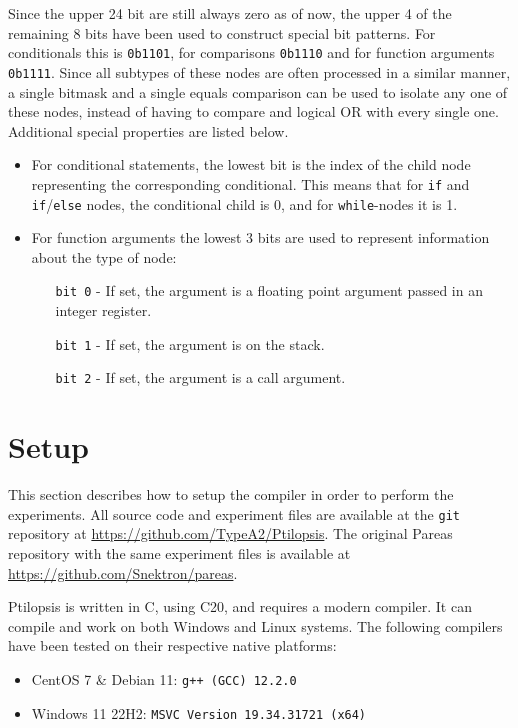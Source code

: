 \documentclass[12pt,dvipsnames]{article}
\newcommand{\icpp}[1]{\texttt{#1}}
\newcommand{\mono}[1]{\texttt{#1}}
\newcommand{\Rplus}{\protect\hspace{-.1em}\protect\raisebox{.35ex}{\smaller{\smaller\textbf{+}}}}
\newcommand{\Cpp}{\mbox{C\Rplus\Rplus}\xspace}
\newcommand{\CppXX}{\mbox{C\Rplus\Rplus20}\xspace}
\begin{document}
Since the upper 24 bit are still always zero as of now, the upper 4 of the remaining 8 bits have been used to construct special bit patterns. For conditionals this is \mono{0b1101}, for comparisons \mono{0b1110} and for function arguments \mono{0b1111}. Since all subtypes of these nodes are often processed in a similar manner, a single bitmask and a single equals comparison can be used to isolate any one of these nodes, instead of having to compare and logical OR with every single one. Additional special properties are listed below.
\begin{itemize}
    \item For conditional statements, the lowest bit is the index of the child node representing the corresponding conditional. This means that for \icpp{if} and \icpp{if}/\icpp{else} nodes, the conditional child is 0, and for \icpp{while}-nodes it is 1.
    \item For function arguments the lowest 3 bits are used to represent information about the type of node:
    \begin{itemize}
        \item[\mono{bit 0}] - If set, the argument is a floating point argument passed in an integer register.
        \item[\mono{bit 1}] - If set, the argument is on the stack.
        \item[\mono{bit 2}] - If set, the argument is a call argument.
    \end{itemize}
\end{itemize}

\newpage
\section{Setup} \label{setup}
This section describes how to setup the compiler in order to perform the experiments. All source code and experiment files are available at the \mono{git} repository at \url{https://github.com/TypeA2/Ptilopsis}. The original Pareas repository with the same experiment files is available at \url{https://github.com/Snektron/pareas}.

Ptilopsis is written in \Cpp, using \CppXX, and requires a modern compiler. It can compile and work on both Windows and Linux systems. The following compilers have been tested on their respective native platforms:
\begin{itemize}
    \item CentOS 7 \& Debian 11: \mono{g++ (GCC) 12.2.0}
    \item Windows 11 22H2: \mono{MSVC Version 19.34.31721 (x64)}
\end{itemize}
\end{document}
